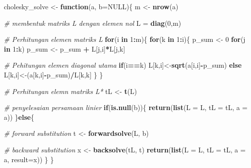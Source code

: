 \documentclass[
]{book}
\newenvironment{Shaded}{\begin{snugshade}}{\end{snugshade}}
\newcommand{\AttributeTok}[1]{\textcolor[rgb]{0.13,0.29,0.53}{#1}}
\newcommand{\CommentTok}[1]{\textcolor[rgb]{0.56,0.35,0.01}{\textit{#1}}}
\newcommand{\ConstantTok}[1]{\textcolor[rgb]{0.56,0.35,0.01}{#1}}
\newcommand{\ControlFlowTok}[1]{\textcolor[rgb]{0.13,0.29,0.53}{\textbf{#1}}}
\newcommand{\DecValTok}[1]{\textcolor[rgb]{0.00,0.00,0.81}{#1}}
\newcommand{\FunctionTok}[1]{\textcolor[rgb]{0.13,0.29,0.53}{\textbf{#1}}}
\newcommand{\NormalTok}[1]{#1}
\newcommand{\OtherTok}[1]{\textcolor[rgb]{0.56,0.35,0.01}{#1}}
\newcommand{\SpecialCharTok}[1]{\textcolor[rgb]{0.81,0.36,0.00}{\textbf{#1}}}
\theoremstyle{definition}
\theoremstyle{definition}
\theoremstyle{definition}
\theoremstyle{definition}
\theoremstyle{remark}
\begin{document}
\begin{Shaded}
\begin{Highlighting}[]
\NormalTok{cholesky\_solve }\OtherTok{\textless{}{-}} \ControlFlowTok{function}\NormalTok{(a, }\AttributeTok{b=}\ConstantTok{NULL}\NormalTok{)\{}
\NormalTok{    m }\OtherTok{\textless{}{-}} \FunctionTok{nrow}\NormalTok{(a)}
   
\CommentTok{\# membentuk matriks L dengan elemen nol}
\NormalTok{    L }\OtherTok{=} \FunctionTok{diag}\NormalTok{(}\DecValTok{0}\NormalTok{,m)}

\CommentTok{\# Perhitungan elemen matriks L}
    \ControlFlowTok{for}\NormalTok{(i }\ControlFlowTok{in} \DecValTok{1}\SpecialCharTok{:}\NormalTok{m)\{}
        \ControlFlowTok{for}\NormalTok{(k }\ControlFlowTok{in} \DecValTok{1}\SpecialCharTok{:}\NormalTok{i)\{}
\NormalTok{            p\_sum }\OtherTok{\textless{}{-}} \DecValTok{0}
            \ControlFlowTok{for}\NormalTok{(j }\ControlFlowTok{in} \DecValTok{1}\SpecialCharTok{:}\NormalTok{k)}
\NormalTok{                p\_sum }\OtherTok{\textless{}{-}}\NormalTok{ p\_sum }\SpecialCharTok{+}\NormalTok{ L[j,i]}\SpecialCharTok{*}\NormalTok{L[j,k]}
                
\CommentTok{\# Pehitungan elemen diagonal utama}
            \ControlFlowTok{if}\NormalTok{(i}\SpecialCharTok{==}\NormalTok{k)}
\NormalTok{                L[k,i]}\OtherTok{\textless{}{-}}\FunctionTok{sqrt}\NormalTok{(a[i,i]}\SpecialCharTok{{-}}\NormalTok{p\_sum)}
            \ControlFlowTok{else}
\NormalTok{                L[k,i]}\OtherTok{\textless{}{-}}\NormalTok{(a[k,i]}\SpecialCharTok{{-}}\NormalTok{p\_sum)}\SpecialCharTok{/}\NormalTok{L[k,k]}
\NormalTok{        \}}
\NormalTok{    \}}
    
\CommentTok{\# Perhitungan elemn matriks L*}
\NormalTok{    tL }\OtherTok{\textless{}{-}} \FunctionTok{t}\NormalTok{(L)}
    
\CommentTok{\# penyelesaian persamaan linier}
    \ControlFlowTok{if}\NormalTok{(}\FunctionTok{is.null}\NormalTok{(b))\{}
      \FunctionTok{return}\NormalTok{(}\FunctionTok{list}\NormalTok{(}\AttributeTok{L =}\NormalTok{ L, }\AttributeTok{tL =}\NormalTok{ tL, }\AttributeTok{a =}\NormalTok{ a))}
\NormalTok{    \}}\ControlFlowTok{else}\NormalTok{\{}
      
      \CommentTok{\# forward substitution}
\NormalTok{      t }\OtherTok{\textless{}{-}} \FunctionTok{forwardsolve}\NormalTok{(L, b)}
      
      \CommentTok{\# backward substitution}
\NormalTok{      x }\OtherTok{\textless{}{-}} \FunctionTok{backsolve}\NormalTok{(tL, t)}
      \FunctionTok{return}\NormalTok{(}\FunctionTok{list}\NormalTok{(}\AttributeTok{L =}\NormalTok{ L, }\AttributeTok{tL =}\NormalTok{ tL, }\AttributeTok{a =}\NormalTok{ a, }\AttributeTok{result=}\NormalTok{x))}
\NormalTok{     \}}
\NormalTok{\}}
\end{Highlighting}
\end{Shaded}
\end{document}
